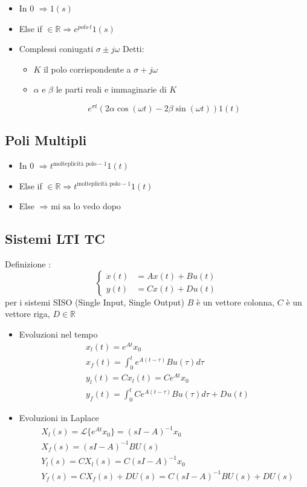 \documentclass{article}
\begin{document}
\begin{itemize}
\item In 0 $\Rightarrow 1(s)$
\item Else if $\in \mathbb{R} \Rightarrow e^{polo\ t} 1(s)$
\item Complessi coniugati \(\sigma \pm j\omega\) Detti:
  \begin{itemize}
  \item \(K\) il polo corrispondente a $\sigma + j\omega$
  \item \(\alpha\) e \(\beta\) le parti reali e immaginarie di \(K\)
  \end{itemize}
  \[ e^{\sigma t} (2 \alpha \cos(\omega t) - 2 \beta \sin(\omega t)) 1(t) \]
\end{itemize}

\subsection{Poli Multipli}
\begin{itemize}
\item In 0 $\Rightarrow t^{\text{molteplicità polo} -1} 1(t)$
\item Else if $ \in \mathbb{R} \Rightarrow t^{\text{molteplicità polo} -1} 1(t)$
\item Else $\Rightarrow \text{ mi sa lo vedo dopo}$
\end{itemize}

\subsection{Sistemi LTI TC}
Definizione : 
\[\begin{cases}
\dot{x}(t) &= Ax(t) + Bu(t) \\
y(t) &= Cx(t) + Du(t)
\end{cases} \]
per i sistemi SISO (Single Input, Single Output) \(B\) è un vettore colonna,
\(C\) è un vettore riga, \(D \in \mathbb{R}\)
\begin{itemize}
\item Evoluzioni nel tempo
  \begin{align*}
    &x_l (t) = e^{At} x_0 \\
    &x_f (t) = \int_{0}^{t} e^{A(t-\tau)} Bu(\tau) d \tau \\
    &y_l (t) = C x_l (t) = Ce^{At} x_0 \\
    &y_f (t) = \int_{0}^{t} C e^{A(t-\tau)} Bu(\tau) d \tau + D u(t) 
  \end{align*}
\item Evoluzioni in Laplace
  \begin{align*}
    &X_l (s) = \mathcal{L} \{e^{At} x_0\} = (sI - A)^{-1} x_0 \\
    &X_f (s) = (sI - A)^{-1} BU(s) \\
    &Y_l (s) = C X_l (s) = C(sI - A)^{-1} x_0 \\
    &Y_f (s) = C X_f (s) + D U(s) = C(sI - A)^{-1} BU(s) + DU(s)
  \end{align*}
\end{itemize}
\end{document}
